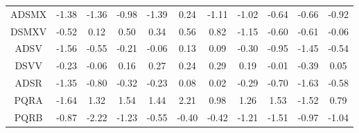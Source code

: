\begin{longtable}{ | c || c | c | c | c | c | c | c | c | c || c |}
ADSMX &  \cellcolor[HTML]{FFDFDF} -1.38 &  \cellcolor[HTML]{FFDFDF} -1.36 &  \cellcolor[HTML]{FFE7E7} -0.98 &  \cellcolor[HTML]{FFDFDF} -1.39 &  \cellcolor[HTML]{F7F7FF} 0.24 &  \cellcolor[HTML]{FFE7E7} -1.11 &  \cellcolor[HTML]{FFE7E7} -1.02 &  \cellcolor[HTML]{FFEFEF} -0.64 &  \cellcolor[HTML]{FFEFEF} -0.66 &  \cellcolor[HTML]{FFE7E7} -0.92 \\
DSMXV &  \cellcolor[HTML]{FFEFEF} -0.52 &  \cellcolor[HTML]{FFFFFF} 0.12 &  \cellcolor[HTML]{EFEFFF} 0.50 &  \cellcolor[HTML]{F7F7FF} 0.34 &  \cellcolor[HTML]{EFEFFF} 0.56 &  \cellcolor[HTML]{E7E7FF} 0.82 &  \cellcolor[HTML]{FFDFDF} -1.15 &  \cellcolor[HTML]{FFEFEF} -0.60 &  \cellcolor[HTML]{FFEFEF} -0.61 &  \cellcolor[HTML]{FFFFFF} -0.06 \\
ADSV &  \cellcolor[HTML]{FFD7D7} -1.56 &  \cellcolor[HTML]{FFEFEF} -0.55 &  \cellcolor[HTML]{FFF7F7} -0.21 &  \cellcolor[HTML]{FFFFFF} -0.06 &  \cellcolor[HTML]{FFFFFF} 0.13 &  \cellcolor[HTML]{FFFFFF} 0.09 &  \cellcolor[HTML]{FFF7F7} -0.30 &  \cellcolor[HTML]{FFE7E7} -0.95 &  \cellcolor[HTML]{FFD7D7} -1.45 &  \cellcolor[HTML]{FFEFEF} -0.54 \\
DSVV &  \cellcolor[HTML]{FFF7F7} -0.23 &  \cellcolor[HTML]{FFFFFF} -0.06 &  \cellcolor[HTML]{F7F7FF} 0.16 &  \cellcolor[HTML]{F7F7FF} 0.27 &  \cellcolor[HTML]{F7F7FF} 0.24 &  \cellcolor[HTML]{F7F7FF} 0.29 &  \cellcolor[HTML]{F7F7FF} 0.19 &  \cellcolor[HTML]{FFFFFF} -0.01 &  \cellcolor[HTML]{FFF7F7} -0.39 &  \cellcolor[HTML]{FFFFFF} 0.05 \\
ADSR &  \cellcolor[HTML]{FFDFDF} -1.35 &  \cellcolor[HTML]{FFE7E7} -0.80 &  \cellcolor[HTML]{FFF7F7} -0.32 &  \cellcolor[HTML]{FFF7F7} -0.23 &  \cellcolor[HTML]{FFFFFF} 0.08 &  \cellcolor[HTML]{FFFFFF} 0.02 &  \cellcolor[HTML]{FFF7F7} -0.29 &  \cellcolor[HTML]{FFEFEF} -0.70 &  \cellcolor[HTML]{FFD7D7} -1.63 &  \cellcolor[HTML]{FFEFEF} -0.58 \\
PQRA &  \cellcolor[HTML]{FFD7D7} -1.64 &  \cellcolor[HTML]{DFDFFF} 1.32 &  \cellcolor[HTML]{D7D7FF} 1.54 &  \cellcolor[HTML]{D7D7FF} 1.44 &  \cellcolor[HTML]{C7C7FF} 2.21 &  \cellcolor[HTML]{E7E7FF} 0.98 &  \cellcolor[HTML]{DFDFFF} 1.26 &  \cellcolor[HTML]{D7D7FF} 1.53 &  \cellcolor[HTML]{FFD7D7} -1.52 &  \cellcolor[HTML]{EFEFFF} 0.79 \\
PQRB &  \cellcolor[HTML]{FFE7E7} -0.87 &  \cellcolor[HTML]{FFC7C7} -2.22 &  \cellcolor[HTML]{FFDFDF} -1.23 &  \cellcolor[HTML]{FFEFEF} -0.55 &  \cellcolor[HTML]{FFF7F7} -0.40 &  \cellcolor[HTML]{FFF7F7} -0.42 &  \cellcolor[HTML]{FFDFDF} -1.21 &  \cellcolor[HTML]{FFD7D7} -1.51 &  \cellcolor[HTML]{FFE7E7} -0.97 &  \cellcolor[HTML]{FFE7E7} -1.04 \\

\end{longtable}
